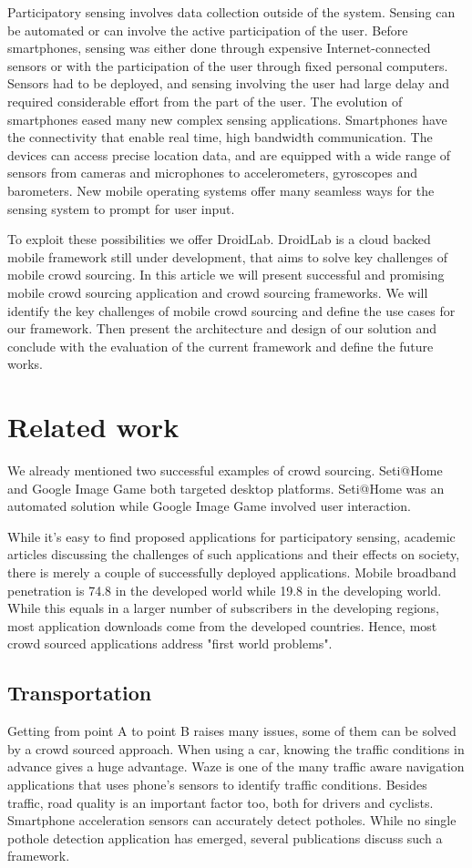 \documentclass[conference,letterpaper]{IEEEtran}
\begin{document}
Participatory sensing involves data collection outside of the system. Sensing can be automated or can involve the active participation of the user. Before smartphones, sensing was either done through expensive Internet-connected sensors or with the participation of the user through fixed personal computers. Sensors had to be deployed, and sensing involving the user had large delay and required considerable effort from the part of the user. The evolution of smartphones eased many new complex sensing applications. Smartphones have the connectivity that enable real time, high bandwidth communication. The devices can access precise location data, and are equipped with a wide range of sensors from cameras and microphones to accelerometers, gyroscopes and barometers. New mobile operating systems offer many seamless ways for the sensing system to prompt for user input.

To exploit these possibilities we offer DroidLab. DroidLab is a cloud backed mobile framework still under development, that aims to solve key challenges of mobile crowd sourcing. In this article we will present successful and promising mobile crowd sourcing application and crowd sourcing frameworks. We will identify the key challenges of mobile crowd sourcing and define the use cases for our framework. Then present the architecture and design of our solution and conclude with the evaluation of the current framework and define the future works.
\section{Related work}
\label{sec:related_work}
We already mentioned two successful examples of crowd sourcing. Seti@Home and Google Image Game both targeted desktop platforms. Seti@Home was an automated solution while Google Image Game involved user interaction.

While it's easy to find proposed applications for participatory sensing, academic articles discussing the challenges of such applications and their effects on society, there is merely a couple of successfully deployed applications. Mobile broadband penetration is 74.8 in the developed world while 19.8 in the developing world. While this equals in a larger number of subscribers in the developing regions, most application downloads come from the developed countries. Hence, most crowd sourced applications address "first world problems".

\subsection{Transportation}
Getting from point A to point B raises many issues, some of them can be solved by a crowd sourced approach. When using a car, knowing the traffic conditions in advance gives a huge advantage. Waze is one of the many traffic aware navigation applications that uses phone's sensors to identify traffic conditions. Besides traffic, road quality is an important factor too, both for drivers and cyclists. Smartphone acceleration sensors can accurately detect potholes. While no single pothole detection application has emerged, several publications discuss such a framework.
\end{document}
